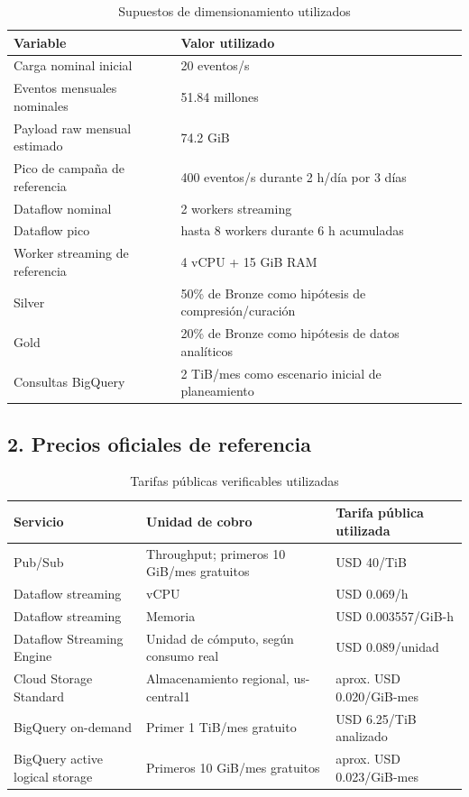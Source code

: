 \documentclass[11pt,a4paper]{article}
\begin{document}
\begin{table}[H]
\caption{Supuestos de dimensionamiento utilizados}\label{tab:supuestos-costos}
\small
\begin{tabularx}{\linewidth}{@{}P{.47\linewidth}Y@{}}\toprule
Variable & Valor utilizado\\\midrule
Carga nominal inicial & 20 eventos/s\\
Eventos mensuales nominales & 51.84 millones\\
Payload raw mensual estimado & 74.2 GiB\\
Pico de campaña de referencia & 400 eventos/s durante 2 h/día por 3 días\\
Dataflow nominal & 2 workers streaming\\
Dataflow pico & hasta 8 workers durante 6 h acumuladas\\
Worker streaming de referencia & 4 vCPU + 15 GiB RAM\\
Silver & 50\% de Bronze como hipótesis de compresión/curación\\
Gold & 20\% de Bronze como hipótesis de datos analíticos\\
Consultas BigQuery & 2 TiB/mes como escenario inicial de planeamiento\\\bottomrule
\end{tabularx}
\end{table}

\subsection*{2. Precios oficiales de referencia}

\begin{table}[H]
\caption{Tarifas públicas verificables utilizadas}\label{tab:precios-gcp}
\small
\begin{tabularx}{\linewidth}{@{}P{.27\linewidth}P{.39\linewidth}Y@{}}\toprule
Servicio & Unidad de cobro & Tarifa pública utilizada\\\midrule
Pub/Sub & Throughput; primeros 10 GiB/mes gratuitos & USD 40/TiB\\
Dataflow streaming & vCPU & USD 0.069/h\\
Dataflow streaming & Memoria & USD 0.003557/GiB-h\\
Dataflow Streaming Engine & Unidad de cómputo, según consumo real & USD 0.089/unidad\\
Cloud Storage Standard & Almacenamiento regional, us-central1 & aprox. USD 0.020/GiB-mes\\
BigQuery on-demand & Primer 1 TiB/mes gratuito & USD 6.25/TiB analizado\\
BigQuery active logical storage & Primeros 10 GiB/mes gratuitos & aprox. USD 0.023/GiB-mes\\\bottomrule
\end{tabularx}
\end{table}
\end{document}
